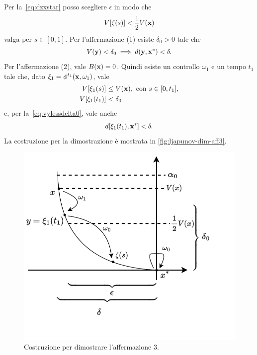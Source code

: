 \begin{steps}
    Per la~\eqref{eq:dzxstar} posso scegliere $\epsilon$ in modo che
    \begin{equation*}
        V[\zeta(s)] < \frac 1 2 V(\mathbf{x})
    \end{equation*}
    valga per $s \in [0, 1]$.
    Per l'affermazione (1) esiste $\delta_0 > 0$ tale che
    \begin{equation}
        V(\mathbf{y}) < \delta_0 \implies d(\mathbf{y}, \mathbf{x}^*) < \delta.
        \label{eq:vylessdelta0}
    \end{equation}
    Per l'affermazione (2), vale $B(\mathbf{x}) = 0$.
    Quindi esiste un controllo $\omega_1$ e un tempo $t_1$ tale
    che, dato $\xi_1 = \phi^{t_1}(\mathbf{x}, \omega_1)$, vale
    \begin{align*}
        V[\xi_1(s)] &\leq V(\mathbf{x}), \text{ con } s \in [0, t_1],\\
        V[\xi_1(t_1)] &< \delta_0
    \end{align*}
    e, per la~\eqref{eq:vylessdelta0}, vale anche
    \begin{equation*}
        d[\xi_1(t_1), \mathbf{x}^*] < \delta.
    \end{equation*}
    La costruzione per la dimostrazione è mostrata in \autoref{fig:ljapunov-dim-aff3}.

    \hfill
    \begin{minipage}{.8\textwidth}
        \begin{figure}[H]
            \centering
            \includegraphics[width=.8\textwidth]{assets/ljapunov-dim-aff3}
            \caption[Costruzione 3 per teorema di Ljapunov]{Costruzione per dimostrare
            l'affermazione 3.}%
            \label{fig:ljapunov-dim-aff3}
        \end{figure}
    \end{minipage}


\end{steps}
